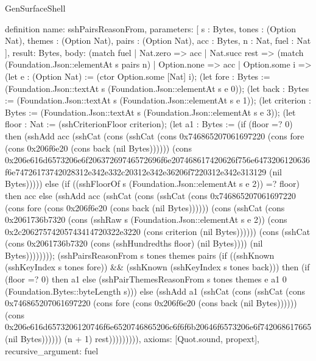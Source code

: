 \begin{lexlean}{GenSurfaceShell}
\begin{semanticmodule}
definition{
  name: sshPairsReasonFrom,
  parameters: [
    s : Bytes,
    tones : (Option Nat),
    themes : (Option Nat),
    pairs : (Option Nat),
    acc : Bytes,
    n : Nat,
    fuel : Nat
  ],
  result: Bytes,
  body: (match fuel
    | Nat.zero => acc
    | Nat.succ rest => (match (Foundation.Json::elementAt s pairs n)
      | Option.none => acc
      | Option.some i => (let e : (Option Nat) := (ctor Option.some [Nat] i); (let fore : Bytes := (Foundation.Json::textAt s (Foundation.Json::elementAt s e 0)); (let back : Bytes := (Foundation.Json::textAt s (Foundation.Json::elementAt s e 1)); (let criterion : Bytes := (Foundation.Json::textAt s (Foundation.Json::elementAt s e 3)); (let floor : Nat := (sshCriterionFloor criterion); (let a1 : Bytes := (if (floor =? 0) then (sshAdd acc (sshCat (cons (sshCat (cons 0x746865207061697220 (cons fore (cons 0x206f6e20 (cons back (nil Bytes)))))) (cons 0x206e616d6573206e6f20637269746572696f6e207468617420626f756e6473206120636f6e74726173742028312e342e332c20312e342e36206f7220312e342e313129 (nil Bytes))))) else (if ((sshFloorOf s (Foundation.Json::elementAt s e 2)) =? floor) then acc else (sshAdd acc (sshCat (cons (sshCat (cons 0x746865207061697220 (cons fore (cons 0x206f6e20 (cons back (nil Bytes)))))) (cons (sshCat (cons 0x2061736b7320 (cons (sshRaw s (Foundation.Json::elementAt s e 2)) (cons 0x2c20627574205743414720322e3220 (cons criterion (nil Bytes)))))) (cons (sshCat (cons 0x2061736b7320 (cons (sshHundredths floor) (nil Bytes)))) (nil Bytes)))))))); (sshPairsReasonFrom s tones themes pairs (if ((sshKnown (sshKeyIndex s tones fore)) && (sshKnown (sshKeyIndex s tones back))) then (if (floor =? 0) then a1 else (sshPairThemesReasonFrom s tones themes e a1 0 (Foundation.Bytes::byteLength s))) else (sshAdd a1 (sshCat (cons (sshCat (cons 0x746865207061697220 (cons fore (cons 0x206f6e20 (cons back (nil Bytes)))))) (cons 0x206e616d6573206120746f6e6520746865206c6f6f6b20646f6573206e6f742068617665 (nil Bytes)))))) (n + 1) rest))))))))),
  axioms: [Quot.sound, propext],
  recursive_argument: fuel
}


\end{semanticmodule}
\end{lexlean}
